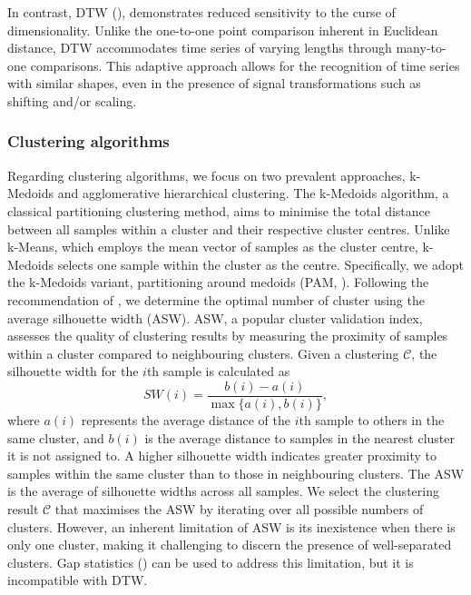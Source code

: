 \documentclass[a4paper,review,12pt,authoryear]{elsarticle}
\begin{document}
In contrast, DTW (\citealp{sakoeDynamicProgrammingAlgorithm1978}), demonstrates reduced sensitivity to the curse of dimensionality. Unlike the one-to-one point comparison inherent in Euclidean distance, DTW accommodates time series of varying lengths through many-to-one comparisons. This adaptive approach allows for the recognition of time series with similar shapes, even in the presence of signal transformations such as shifting and/or scaling.


\subsubsection*{Clustering algorithms}
\label{sec:clustering}




Regarding clustering algorithms, we focus on two prevalent approaches, k-Medoids and agglomerative hierarchical clustering. The k-Medoids algorithm, a classical partitioning clustering method, aims to minimise the total distance between all samples within a cluster and their respective cluster centres. 
Unlike k-Means, which employs the mean vector of samples as the cluster centre, k-Medoids selects one sample within the cluster as the centre. 
Specifically, we adopt the k-Medoids variant, partitioning around medoids (PAM, \citealp{PartitioningMedoidsProgram1990}).
Following the recommendation of \cite{PartitioningMedoidsProgram1990}, we determine the optimal number of cluster using the average silhouette width (ASW).
ASW, a popular cluster validation index, assesses the quality of clustering results by measuring the proximity of samples within a cluster compared to neighbouring clusters.
Given a clustering $\mathcal{C}$, the silhouette width for the $i$th sample is calculated as 
\[
  SW(i) = \frac{b(i)-a(i)}{\max\{a(i), b(i)\}},  
\]
where $a(i)$ represents the average distance of the $i$th sample to others in the same cluster, and $b(i)$ is the average distance to samples in the nearest cluster it is not assigned to. A higher silhouette width indicates greater proximity to samples within the same cluster than to those in neighbouring clusters. The ASW is the average of silhouette widths across all samples. We select the clustering result $\mathcal{C}$ that maximises the ASW by iterating over all possible numbers of clusters. However, an inherent limitation of ASW is its inexistence when there is only one cluster, making it challenging to discern the presence of well-separated clusters. Gap statistics (\citealp{tibshiraniEstimatingNumberClusters2002}) can be used to address this limitation, but it is incompatible with DTW.
\end{document}
